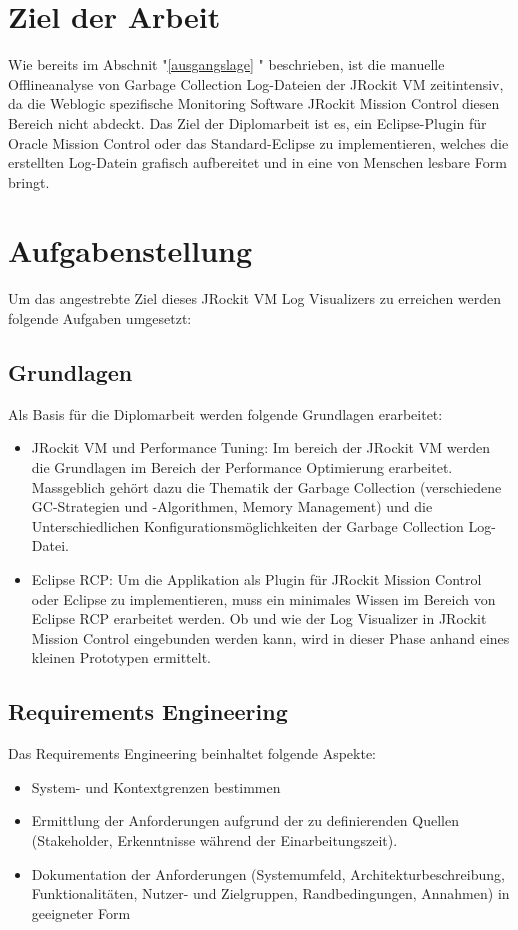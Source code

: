 \section{Ziel der Arbeit}
Wie bereits im Abschnit "\ref{ausgangslage} " beschrieben, ist die manuelle Offlineanalyse von Garbage Collection Log-Dateien der JRockit VM zeitintensiv, da die Weblogic spezifische Monitoring Software JRockit Mission Control diesen Bereich nicht abdeckt. Das Ziel der Diplomarbeit ist es, ein Eclipse-Plugin f\"ur Oracle Mission Control oder das Standard-Eclipse zu implementieren, welches die erstellten Log-Datein grafisch aufbereitet und in eine von Menschen lesbare Form bringt.

\section{Aufgabenstellung}
Um das angestrebte Ziel dieses JRockit VM Log Visualizers zu erreichen werden folgende Aufgaben umgesetzt:
\subsection{Grundlagen}
Als Basis f\"ur die Diplomarbeit werden folgende Grundlagen erarbeitet:
\begin{itemize}
	\item JRockit VM und Performance Tuning: Im bereich der JRockit VM werden die Grundlagen im Bereich der Performance Optimierung erarbeitet. Massgeblich geh\"ort dazu die Thematik der Garbage Collection (verschiedene GC-Strategien und -Algorithmen, Memory Management) und die Unterschiedlichen Konfigurationsm\"oglichkeiten der Garbage Collection Log-Datei.
	\item Eclipse RCP: Um die Applikation als Plugin f\"ur JRockit Mission Control oder Eclipse zu implementieren, muss ein minimales Wissen im Bereich von Eclipse RCP erarbeitet werden. Ob und wie der Log Visualizer in JRockit Mission Control eingebunden werden kann, wird in dieser Phase anhand eines kleinen Prototypen ermittelt.
\end{itemize}

\subsection{Requirements Engineering}
Das Requirements Engineering beinhaltet folgende Aspekte:
\begin{itemize}
	\item System- und Kontextgrenzen bestimmen
	\item Ermittlung der Anforderungen aufgrund der zu definierenden Quellen (Stakeholder, Erkenntnisse w\"ahrend der Einarbeitungszeit).
	\item Dokumentation der Anforderungen (Systemumfeld, Architekturbeschreibung, Funktionalit\"aten, Nutzer- und Zielgruppen, 	Randbedingungen, Annahmen) in geeigneter Form
\end{itemize}


